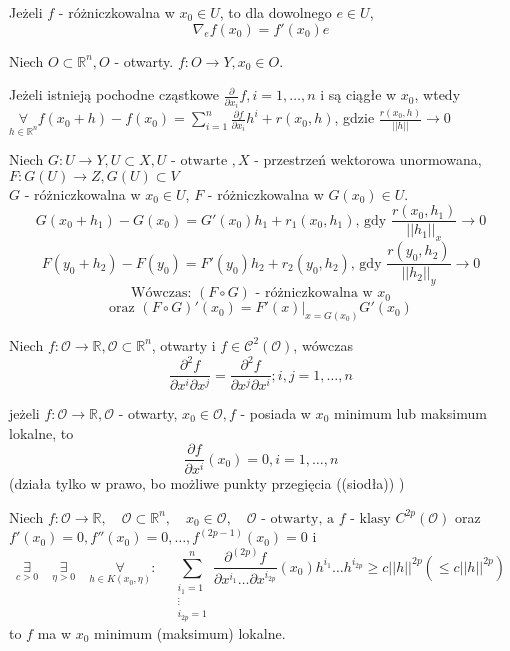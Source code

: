 \documentclass{article}
\begin{document}
\begin{tw}
Jeżeli $f$ - różniczkowalna w $x_0 \in U$, to dla dowolnego $e\in U$, $$\nabla_e f(x_0) = f'(x_0)e$$
\end{tw}
\begin{tw}
Niech $O\subset\mathbb{R}^{n}, O$ - otwarty. $f: O\to Y, x_0\in O$.

Jeżeli istnieją pochodne cząstkowe $\frac{\partial}{\partial x_i} f, i=1,\dots,n$ i są ciągłe w $x_0$, wtedy $\underset{h\in\mathbb{R}^n}{\forall} f(x_0+h)-f(x_0)=\sum_{i=1}^{n} \frac{\partial f}{\partial x_i} h^i+r(x_0,h)$, gdzie $\frac{r(x_0,h)}{||h||}\to0$

\end{tw}
\pagebreak
\begin{tw}
Niech $G:U \to Y, U\subset X, U \text{ - otwarte }, X$ - przestrzeń wektorowa unormowana, $F: G(U) \to Z, G(U) \subset V$\\
$G$ - różniczkowalna w $x_0\in U$, $F$ - różniczkowalna w $G(x_0)\in U$.\\
$$G(x_0 + h_1) - G(x_0) = G'(x_0)h_1+r_1(x_0,h_1)\text{, gdy }\frac{r(x_0,h_1)}{||h_1||_x} \to 0$$
$$F(y_0 + h_2) - F(y_0) = F'(y_0)h_2+r_2(y_0,h_2)\text{, gdy }\frac{r(y_0,h_2)}{||h_2||_y} \to 0$$
$$\text{Wówczas: } (F \circ G ) \text{ - różniczkowalna w } x_0$$
$$\text{oraz } (F \circ G)' (x_0) = \left . F'(x)\right |_{x=G(x_0)} G'(x_0)$$
\end{tw}
\begin{tw}
Niech $f: \mathcal{O}\to\mathbb{R}, \mathcal{O}\subset \mathbb{R}^n$, otwarty i $f\in\mathcal{C}^2(\mathcal{O})$, wówczas
$$\frac{\partial^2 f}{\partial x^i \partial x^j} = \frac{\partial^2 f}{\partial x^j \partial x^i}; i,j=1,\dots,n$$
\end{tw}
\begin{stw}
jeżeli $f: \mathcal{O} \rightarrow \mathbb{R}, \mathcal{O}$ - otwarty, $x_0 \in \mathcal{O}, f$ - posiada w $x_0$ minimum lub maksimum lokalne, to $$\frac{\partial f}{\partial x^i} (x_0) = 0, i = 1,\dots,n$$
(działa tylko w prawo, bo możliwe punkty przegięcia ((siodła)) )
\end{stw}
\begin{tw}
Niech $f: \mathcal{O} \to \mathbb{R}, \quad\mathcal{O}\subset\mathbb{R}^n, \quad x_0\in\mathcal{O}, \quad \mathcal{O} \text{ - otwarty, a } f \text{ - klasy } C^{2p} (\mathcal{O})$ oraz $f'(x_0) = 0, f''(x_0) = 0,\dots,f^{(2p-1)} (x_0) = 0$
i $$\underset{c > 0}{\exists} \quad\underset{\eta > 0}{\exists} \quad\underset{h\in K(x_0,\eta)}{\forall}: \quad \sum_{\substack{i_1 = 1\\ \vdots \\ i_{2p} = 1}}^n \frac{\partial^{(2p)} f}{\partial x^{i_1} \dots \partial x^{i_{2p}}} (x_0) h^{i_1} \dots h^{i_{2p}} \geq c ||h||^{2p} (\leq c||h||^{2p})$$
to $f$ ma w $x_0$ minimum (maksimum) lokalne.
\end{tw}
\end{document}
